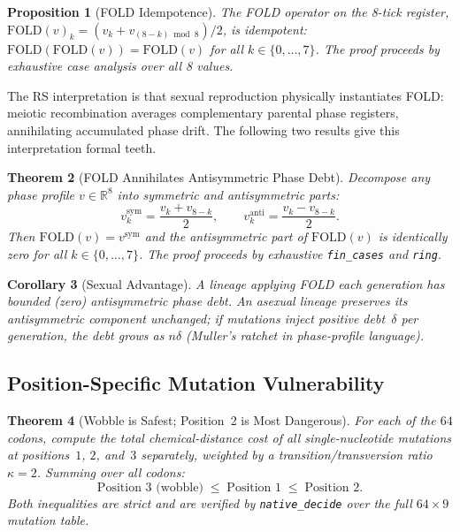 \documentclass[11pt,a4paper]{article}
\newtheorem{theorem}{Theorem}[section]
\newtheorem{proposition}[theorem]{Proposition}
\newtheorem{corollary}[theorem]{Corollary}
\newcommand{\RR}{\mathbb{R}}
\begin{document}
\begin{proposition}[FOLD Idempotence]
\label{prop:fold}
The FOLD operator on the 8-tick register, $\mathrm{FOLD}(v)_k = (v_k + v_{(8-k) \bmod 8})/2$, is idempotent: $\mathrm{FOLD}(\mathrm{FOLD}(v)) = \mathrm{FOLD}(v)$ for all $k \in \{0,\ldots,7\}$. The proof proceeds by exhaustive case analysis over all 8 values.
\end{proposition}

The RS interpretation is that sexual reproduction physically instantiates FOLD: meiotic recombination averages complementary parental phase registers, annihilating accumulated phase drift.  The following two results give this interpretation formal teeth.

\begin{theorem}[FOLD Annihilates Antisymmetric Phase Debt]
\label{thm:fold-cancel}
Decompose any phase profile $v \in \RR^8$ into symmetric and antisymmetric parts:
\[
v^{\mathrm{sym}}_k = \frac{v_k + v_{8-k}}{2},\qquad
v^{\mathrm{anti}}_k = \frac{v_k - v_{8-k}}{2}.
\]
Then $\mathrm{FOLD}(v) = v^{\mathrm{sym}}$ and the antisymmetric part of $\mathrm{FOLD}(v)$ is identically zero for all $k \in \{0,\ldots,7\}$.  The proof proceeds by exhaustive \texttt{fin\_cases} and \texttt{ring}.
\end{theorem}

\begin{corollary}[Sexual Advantage]
\label{cor:sex}
A lineage applying FOLD each generation has bounded (zero) antisymmetric phase debt.  An asexual lineage preserves its antisymmetric component unchanged; if mutations inject positive debt~$\delta$ per generation, the debt grows as $n\delta$ (Muller's ratchet in phase-profile language).
\end{corollary}

\subsection{Position-Specific Mutation Vulnerability}

\begin{theorem}[Wobble is Safest; Position~2 is Most Dangerous]
\label{thm:posorder}
For each of the $64$ codons, compute the total chemical-distance cost of all single-nucleotide mutations at positions~$1$, $2$, and~$3$ separately, weighted by a transition/transversion ratio $\kappa = 2$.  Summing over all codons:
\[
\text{Position 3 (wobble)} \;\leq\; \text{Position 1} \;\leq\; \text{Position 2}.
\]
Both inequalities are strict and are verified by \texttt{native\_decide} over the full $64 \times 9$ mutation table.
\end{theorem}
\end{document}
